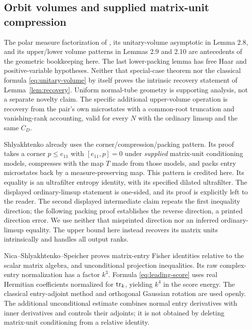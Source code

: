 \documentclass[11pt]{article}
\theoremstyle{definition}\newtheorem{definition}[theorem]{Definition}
\theoremstyle{remark}\newtheorem{remark}[theorem]{Remark}
\begin{document}
\subsection{Orbit volumes and supplied matrix-unit compression}
The polar measure factorization of \cite[Lemma 2.6]{NSSentropy},
its unitary-volume asymptotic in Lemma 2.8, and its upper/lower volume
patterns in Lemmas 2.9 and 2.10 are antecedents of the geometric
bookkeeping here. The last lower-packing lemma has free Haar and
positive-variable hypotheses. Neither that special-case theorem nor
the classical formula \eqref{eq:unitary-volume} by itself proves the
intrinsic recovery statement of Lemma~\ref{lem:recovery}. Uniform
normal-tube geometry is supporting analysis, not a separate novelty
claim. The specific additional upper-volume operation is recovery
from the pair's own microstates with a common-root truncation and
vanishing-rank accounting, valid for every $N$ with the ordinary
limsup and the same $C_D$.

Shlyakhtenko \cite[Section 5, Theorem 5.1]{Shly} already uses the
corner/compression/packing pattern. Its proof takes a corner
$p\leq e_{11}$ with $[e_{11},p]=0$ under \emph{supplied} matrix-unit
conditioning models, compresses with the map $T$ made from those
models, and packs entry microstates back by a measure-preserving map.
This pattern is credited here. Its equality is an ultrafilter entropy
identity, with its specified dilated ultrafilter. The displayed
ordinary-limsup statement is one-sided, and its proof is explicitly
left to the reader. The second displayed intermediate claim repeats
the first inequality direction; the following packing proof establishes
the reverse direction, a printed direction error. We use neither that
misprinted direction nor an inferred ordinary-limsup equality.
The upper bound here instead recovers its matrix units intrinsically
and handles all output ranks.

Nica--Shlyakhtenko--Speicher \cite[Proposition 4.1]{NSSfisher} proves
matrix-entry Fisher identities relative to the scalar matrix algebra,
and unconditional projection inequalities. Its raw complex-entry
normalization has a factor $k^3$. Formula \eqref{eq:leading-score}
uses real Hermitian coefficients normalized for $\operatorname{tr}_k$, yielding
$k^4$ in the score energy. The classical entry-adjoint method and
orthogonal Gaussian rotation are used openly. The additional
unconditional estimate combines normal entry derivatives with inner
derivatives and controls their adjoints; it is not obtained by deleting
matrix-unit conditioning from a relative identity.
\end{document}
